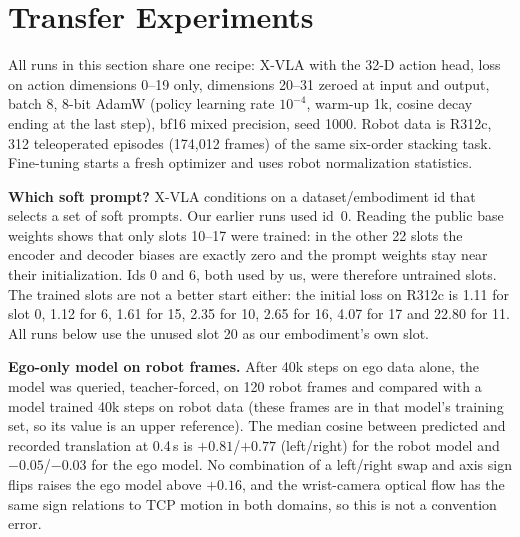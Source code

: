 \documentclass[conference,10pt]{IEEEtran}
\begin{document}
\section{Transfer Experiments}\label{p1:sec:transfer}
All runs in this section share one recipe: X-VLA with the 32-D action head, loss on action dimensions 0--19 only, dimensions
20--31 zeroed at input and output, batch 8, 8-bit AdamW (policy learning rate $10^{-4}$, warm-up 1k, cosine decay ending at the
last step), bf16 mixed precision, seed 1000. Robot data is R312c, 312 teleoperated episodes (174{,}012 frames) of the same
six-order stacking task. Fine-tuning starts a fresh optimizer and uses robot normalization statistics.

\textbf{Which soft prompt?} X-VLA conditions on a dataset/embodiment id that selects a set of soft prompts. Our earlier runs used
id~0. Reading the public base weights shows that only slots 10--17 were trained: in the other 22 slots the encoder and decoder
biases are exactly zero and the prompt weights stay near their initialization. Ids 0 and 6, both used by us, were therefore untrained
slots. The trained slots are not a better start either: the initial loss on R312c is 1.11 for slot 0, 1.12 for 6, 1.61 for 15,
2.35 for 10, 2.65 for 16, 4.07 for 17 and 22.80 for 11. All runs below use the unused slot 20 as our embodiment's own slot.

\textbf{Ego-only model on robot frames.} After 40k steps on ego data alone, the model was queried, teacher-forced, on 120 robot
frames and compared with a model trained 40k steps on robot data (these frames are in that model's training set, so its value
is an upper reference). The median cosine between predicted and recorded translation at 0.4\,s is $+0.81$/$+0.77$ (left/right)
for the robot model and $-0.05$/$-0.03$ for the ego model. No combination of a left/right swap and axis sign flips raises the ego
model above $+0.16$, and the wrist-camera optical flow has the same sign relations to TCP motion in both domains, so this is not
a convention error.
\end{document}
